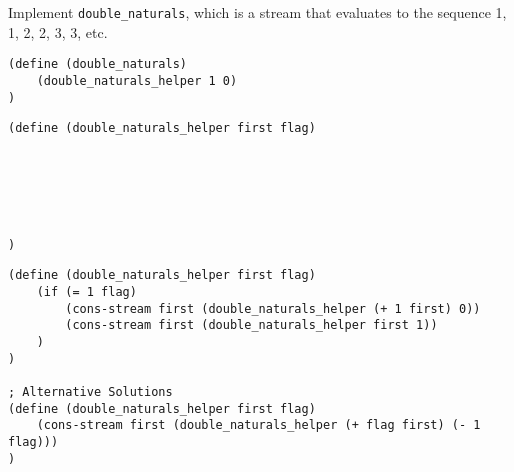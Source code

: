 \begin{blocksection}
\question Implement \lstinline$double_naturals$, which is a stream that evaluates to the sequence 1, 1, 2, 2, 3, 3, etc.

\begin{lstlisting}
(define (double_naturals)
    (double_naturals_helper 1 0)
)
\end{lstlisting}

\ifprintanswers\else
\begin{lstlisting}
(define (double_naturals_helper first flag)






)
\end{lstlisting}
\fi

\begin{solution}[1in]
\begin{lstlisting}
(define (double_naturals_helper first flag)
    (if (= 1 flag)
        (cons-stream first (double_naturals_helper (+ 1 first) 0))
        (cons-stream first (double_naturals_helper first 1))
    )
)

; Alternative Solutions
(define (double_naturals_helper first flag)
    (cons-stream first (double_naturals_helper (+ flag first) (- 1 flag)))
)
\end{lstlisting}
\end{solution}
\end{blocksection}
